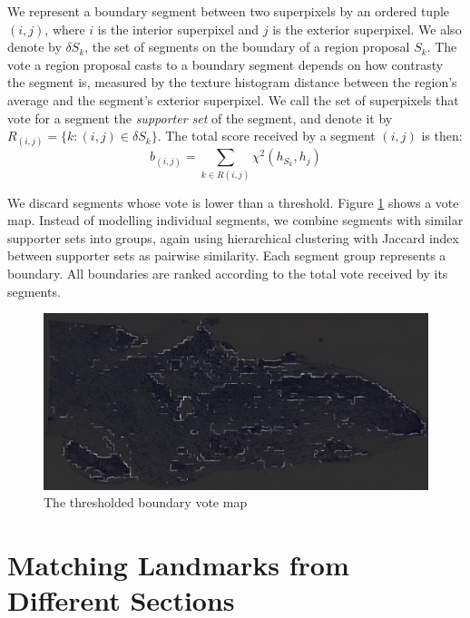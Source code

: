 \documentclass{llncs}
\begin{document}
We represent a boundary segment between two superpixels by an ordered tuple $(i,j)$, where $i$ is the interior superpixel and $j$ is the exterior superpixel. We also denote by $\delta S_k$, the set of segments on the boundary of a region proposal $S_k$. 
The vote a region proposal casts to a boundary segment depends on how contrasty the segment is, measured by the texture histogram distance between the region's average and the segment's exterior superpixel. We call the set of superpixels that vote for a segment the \textit{supporter set} of the segment, and denote it by $R_{(i,j)} = \{k: (i,j) \in \delta S_k\}$. The total score received by a segment $(i,j)$ is then: 
$$ b_{(i,j)} = \sum_{k \in R(i,j)} \chi^2(h_{S_k}, h_j)$$

We discard segments whose vote is lower than a threshold. Figure \ref{fig:BoundaryMap} shows a vote map. Instead of modelling individual segments, we combine segments with similar supporter sets into groups, again using hierarchical clustering with Jaccard index between supporter sets as pairwise similarity. Each segment group represents a boundary. All boundaries are ranked according to the total vote received by its segments. 

\begin{figure}
	\includegraphics[width=\textwidth]{../figures/BoundaryMapSmall.png}
	\caption{The thresholded boundary vote map}
	\label{fig:BoundaryMap}
\end{figure}


\section{Matching Landmarks from Different Sections}
\end{document}
